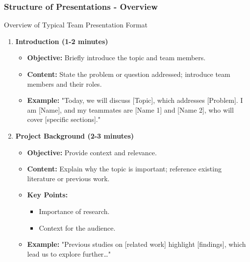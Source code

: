 \documentclass{beamer}
\begin{document}
\begin{frame}[fragile]
    \frametitle{Structure of Presentations - Overview}
    \begin{block}{Overview of Typical Team Presentation Format}
        \begin{enumerate}
            \item \textbf{Introduction (1-2 minutes)}
                \begin{itemize}
                    \item \textbf{Objective:} Briefly introduce the topic and team members.
                    \item \textbf{Content:} State the problem or question addressed; introduce team members and their roles.
                    \item \textbf{Example:} "Today, we will discuss [Topic], which addresses [Problem]. I am [Name], and my teammates are [Name 1] and [Name 2], who will cover [specific sections]."
                \end{itemize}  

            \item \textbf{Project Background (2-3 minutes)}
                \begin{itemize}
                    \item \textbf{Objective:} Provide context and relevance.
                    \item \textbf{Content:} Explain why the topic is important; reference existing literature or previous work.
                    \item \textbf{Key Points:}
                        \begin{itemize}
                            \item Importance of research.
                            \item Context for the audience.
                        \end{itemize}
                    \item \textbf{Example:} "Previous studies on [related work] highlight [findings], which lead us to explore further…"
                \end{itemize}
        \end{enumerate}
    \end{block}
\end{frame}
\end{document}
